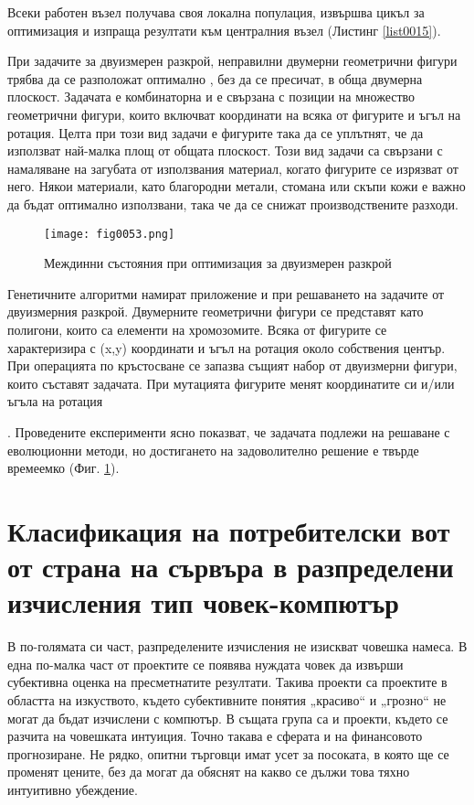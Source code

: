 Всеки работен възел получава своя локална популация, извършва цикъл за оптимизация и изпраща резултати към централния възел (Листинг \ref{list0015}).

При задачите за двуизмерен разкрой, неправилни двумерни геометрични фигури трябва да се разположат оптимално , без да се пресичат, в обща двумерна плоскост. Задачата е комбинаторна и е свързана с позиции на множество геометрични фигури, които включват координати на всяка от фигурите и ъгъл на ротация. Целта при този вид задачи е фигурите така да се уплътнят, че да използват най-малка площ от общата плоскост. Този вид задачи са свързани с намаляване на загубата от използвания материал, когато фигурите се изрязват от него. Някои материали, като благородни метали, стомана или скъпи кожи е важно да бъдат оптимално използвани, така че да се снижат производствените разходи. 

\begin{figure}[H]
  \centering
  \texttt{[image: fig0053.png]}
  \caption{Междинни състояния при оптимизация за двуизмерен разкрой}
\label{fig0053}
\end{figure}

Генетичните алгоритми намират приложение и при решаването на задачите от двуизмерния разкрой. Двумерните геометрични фигури се представят като полигони, които са елементи на хромозомите. Всяка от фигурите се характеризира с (x,y) координати и ъгъл на ротация около собствения център. При операцията по кръстосване се запазва същият набор от двуизмерни фигури, които съставят задачата. При мутацията фигурите менят координатите си и/или ъгъла на ротация\begin{comment}\cite{Balabanov-03}\end{comment}. Проведените експерименти ясно показват, че задачата подлежи на решаване с еволюционни методи, но достигането на задоволително решение е твърде времеемко (Фиг. \ref{fig0053}).

\section{Класификация на потребителски вот от страна на сървъра в разпределени изчисления тип човек-компютър}

В по-голямата си част, разпределените изчисления не изискват човешка намеса. В една по-малка част от проектите се появява нуждата човек да извърши субективна оценка на пресметнатите резултати. Такива проекти са проектите в областта на изкуството, където субективните понятия „красиво“ и „грозно“ не могат да бъдат изчислени с компютър. В същата група са и проекти, където се разчита на човешката интуиция. Точно такава е сферата и на финансовото прогнозиране. Не рядко, опитни търговци имат усет за посоката, в която ще се променят цените, без да могат да обяснят на какво се дължи това тяхно интуитивно убеждение. 

